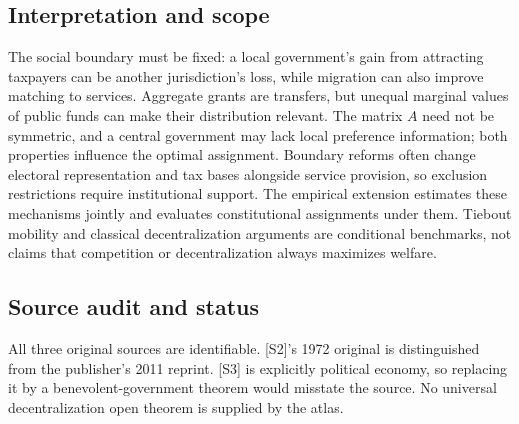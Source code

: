 \documentclass[11pt,a4paper]{article}
\begin{document}
\subsection*{Interpretation and scope}
The social boundary must be fixed: a local government's gain from attracting taxpayers can be another jurisdiction's loss, while migration can also improve matching to services. Aggregate grants are transfers, but unequal marginal values of public funds can make their distribution relevant. The matrix $A$ need not be symmetric, and a central government may lack local preference information; both properties influence the optimal assignment. Boundary reforms often change electoral representation and tax bases alongside service provision, so exclusion restrictions require institutional support. The empirical extension estimates these mechanisms jointly and evaluates constitutional assignments under them. Tiebout mobility and classical decentralization arguments are conditional benchmarks, not claims that competition or decentralization always maximizes welfare.

\subsection*{Source audit and status}
All three original sources are identifiable. [S2]'s 1972 original is distinguished from the publisher's 2011 reprint. [S3] is explicitly political economy, so replacing it by a benevolent-government theorem would misstate the source. No universal decentralization open theorem is supplied by the atlas.
\end{document}
